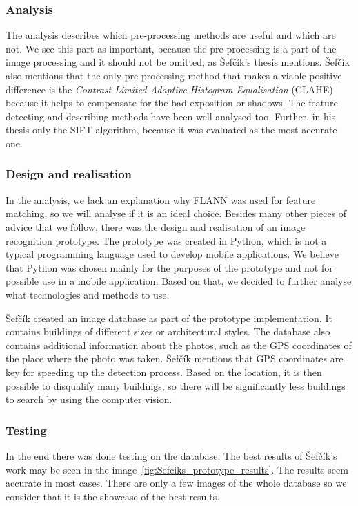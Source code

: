 \documentclass[thesis=B,english]{FITthesis}[2019/12/23]
\begin{document}
                \subsubsection*{Analysis}
                The analysis describes which pre-processing methods are useful and which are not. We see this part as important, because the pre-processing is a part of the image processing and it should not be omitted, as Šefčík's thesis mentions. Šefčík also mentions that the only pre-processing method that makes a viable positive difference is the \textit{Contrast Limited Adaptive Histogram Equalisation} (CLAHE) because it helps to compensate for the bad exposition or shadows. The feature detecting and describing methods have been well analysed too. Further, in his thesis only the SIFT algorithm, because it was evaluated as the most accurate one.
                
                \subsubsection*{Design and realisation}
                In the analysis, we lack an explanation why FLANN was used for feature matching, so we will analyse if it is an ideal choice. Besides many other pieces of advice that we follow, there was the design and realisation of an image recognition prototype. The prototype was created in Python, which is not a typical programming language used to develop mobile applications. We believe that Python was chosen mainly for the purposes of the prototype and not for possible use in a mobile application. Based on that, we decided to further analyse what technologies and methods to use.
                
                Šefčík created an image database as part of the prototype implementation. It contains buildings of different sizes or architectural styles. The database also contains additional information about the photos, such as the GPS coordinates of the place where the photo was taken. Šefčík mentions that GPS coordinates are key for speeding up the detection process. Based on the location, it is then possible to disqualify many buildings, so there will be significantly less buildings to search by using the computer vision.
               
                \subsubsection*{Testing}
                In the end there was done testing on the database. The best results of Šefčík’s work may be seen in the image~\ref{fig:Sefciks_prototype_results}. The results seem accurate in most cases. There are only a few images of the whole database so we consider that it is the showcase of the best results.
                
\end{document}
